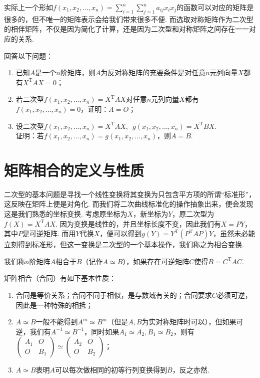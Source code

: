 实际上一个形如$f(x_1,x_2,\ldots,x_n)=\displaystyle\sum_{i=1}^{n}\sum_{j=1}^{n}a_{ij}x_ix_j$的函数可以对应的矩阵是很多的，但不唯一的矩阵表示会给我们带来很多不便. 而选取对称矩阵作为二次型的相伴矩阵，不仅是因为简化了计算，还是因为二次型和对称矩阵之间存在一一对应的关系.

\begin{example}{}{}
    回答以下问题：
    \begin{enumerate}
        \item 已知$A$是一个$n$阶矩阵，则$A$为反对称矩阵的充要条件是对任意$n$元列向量$X$都有$X^\mathrm{T}AX=0$；

        \item 若二次型$f(x_1,x_2,\ldots,x_n)=X^\mathrm{T}AX$对任意$n$元列向量$X$都有$f(x_1,x_2,\ldots,x_n)=0$，证明：$A=O$；

        \item 设二次型$f(x_1,x_2,\ldots,x_n)=X^\mathrm{T}AX,\enspace g(x_1,x_2,\ldots,x_n)=X^\mathrm{T}BX$.\\
              证明：若$f(x_1,x_2,\ldots,x_n)=g(x_1,x_2,\ldots,x_n)$，则$A=B$.
    \end{enumerate}
\end{example}

\section{矩阵相合的定义与性质}

二次型的基本问题是寻找一个线性变换将其变换为只包含平方项的所谓“标准形”，这反映在矩阵上便是对角化. 而我们将二次曲线标准化的操作抽象出来，便会发现这是我们熟悉的坐标变换. 考虑原坐标为$X$，新坐标为$Y$，原二次型为$f(X) = X^\mathrm{T}AX$. 因为变换是线性的，并且坐标长度不变，因此我们有$X=PY$，其中$P$是可逆矩阵. 而用$Y$代换$X$，便可以得到$g(Y) = Y^\mathrm{T}(P^\mathrm{T}AP)Y$，虽然未必能立刻得到标准形，但这一变换是二次型的一个基本操作，我们称之为相合变换.

\begin{definition}{}{}
    我们称$n$阶矩阵$A$相合于$B$（记作$A\simeq B$），如果存在可逆矩阵$C$使得$B=C^\mathrm{T}AC$.
\end{definition}
矩阵相合（合同）有如下基本性质：
\begin{enumerate}
    \item 合同是等价关系；合同不同于相似，是与数域有关的；合同要求$C$必须可逆，因此是一种特殊的相抵；

    \item $A\simeq B$一般不能得到$A^m\simeq B^m$（但是$A,B$为实对称矩阵时可以），但如果可逆，我们有$A^{-1}\simeq B^{-1}$，同时如果$A_1\simeq A_2,B_1\simeq B_2$，则有$\begin{pmatrix}
                  A_1 & O \\ O & B_1
              \end{pmatrix}\simeq\begin{pmatrix}
                  A_2 & O \\ O & B_2
              \end{pmatrix}$；

    \item $A\simeq B$表明$A$可以每次做相同的初等行列变换得到$B$，反之亦然.
\end{enumerate}

